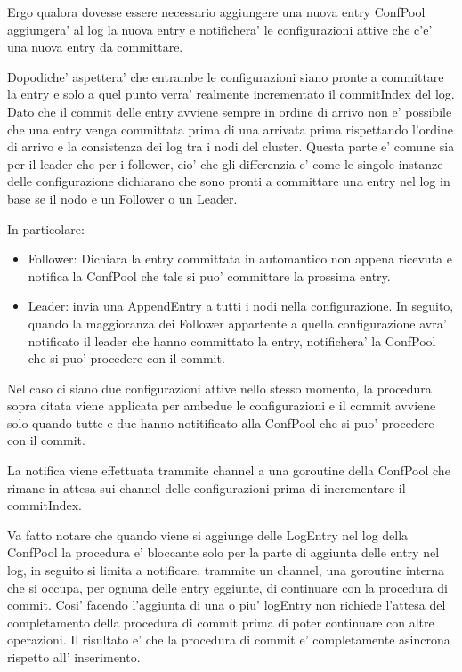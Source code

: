 \begin{itemize}
        Ergo qualora dovesse essere necessario aggiungere una nuova entry ConfPool aggiungera'
        al log la nuova entry e notifichera' le configurazioni attive che c'e' una nuova entry
        da committare.

        Dopodiche' aspettera' che entrambe le configurazioni siano pronte a committare la entry
        e solo a quel punto verra' realmente incrementato il commitIndex del log. Dato che il commit
        delle entry avviene sempre in ordine di arrivo non e' possibile che una entry venga 
        committata prima di una arrivata prima rispettando l'ordine di arrivo e la consistenza dei
        log tra i nodi del cluster.
        Questa parte e' comune sia per il leader che per i follower, cio' che gli differenzia 
        e' come le singole instanze delle configurazione dichiarano che sono pronti a committare
        una entry nel log in base se il nodo e un Follower o un Leader.

        In particolare:
        \begin{itemize}
            \item Follower: Dichiara la entry committata in automantico non appena ricevuta
                e notifica la ConfPool che tale si puo' committare la prossima entry.
            \item Leader: invia una AppendEntry a tutti i nodi nella configurazione.
                In seguito, quando la maggioranza dei Follower appartente a quella configurazione
                avra' notificato il leader che hanno committato la entry, notifichera' la ConfPool
                che si puo' procedere con il commit.
        \end{itemize}
        Nel caso ci siano due configurazioni attive nello stesso momento, la procedura sopra
        citata viene applicata per ambedue le configurazioni e il commit avviene solo quando
        tutte e due hanno notitificato alla ConfPool che si puo' procedere con il commit.

        La notifica viene effettuata trammite channel a una goroutine della ConfPool che rimane
        in attesa sui channel delle configurazioni prima di incrementare il commitIndex.

        Va fatto notare che quando viene si aggiunge delle LogEntry nel log della ConfPool
        la procedura e' bloccante solo per la parte di aggiunta delle entry nel log, in seguito
        si limita a notificare, trammite un channel, una goroutine interna che si occupa, per 
        ognuna delle entry eggiunte, di continuare con la procedura di commit.
        Cosi' facendo l'aggiunta di una o piu' logEntry non richiede l'attesa del completamento
        della procedura di commit prima di poter continuare con altre operazioni.
        Il risultato e' che la procedura di commit e' completamente asincrona rispetto all'
        inserimento.


\end{itemize}
